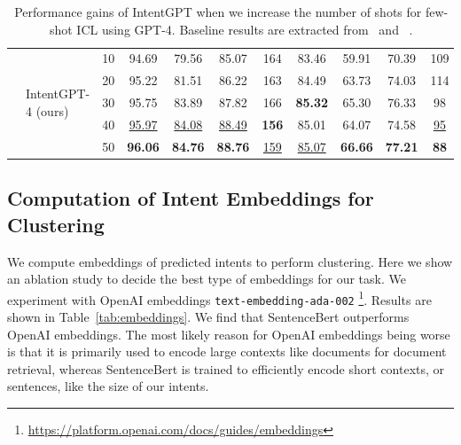 \documentclass[11pt]{article}
\begin{document}
\begin{table}[ht]
{\begin{tabular}{@{}llccccccccc@{}}
                                        & \multirow{5}{*}{IntentGPT-4 (ours)}
                                        & 10 & 94.69 & 79.56 & 85.07 & 164 & 83.46 & 59.91 & 70.39 & 109\\
                                        & & 20 & 95.22 & 81.51 & 86.22 & 163 & 84.49 & 63.73 & 74.03 & 114\\
                                        & & 30 & 95.75 & 83.89 & 87.82 & 166 & \textbf{85.32} & 65.30 & 76.33 & 98\\
                                        & & 40 & \underline{95.97} & \underline{84.08} & \underline{88.49} & \textbf{156} & 85.01 & 64.07 & 74.58 & \underline{95}\\
                                        & & 50 & \textbf{96.06} & \textbf{84.76} & \textbf{88.76} & \underline{159} & \underline{85.07} & \textbf{66.66} & \textbf{77.21} & \textbf{88}\\
        \bottomrule
    \end{tabular}
    
    }
\caption{Performance gains of IntentGPT when we increase the number of shots for few-shot ICL using GPT-4. Baseline results are extracted from~\citet{kumar2022intent} and ~\citet{zhang2021discovering}.}
\vspace{-2mm}
\label{tab:increase-shots}
\end{table}

\subsection{Computation of Intent Embeddings for Clustering}
We compute embeddings of predicted intents to perform clustering. Here we show an ablation study to decide the best type of embeddings for our task. We experiment with OpenAI embeddings \texttt{text-embedding-ada-002} \footnote{\url{https://platform.openai.com/docs/guides/embeddings}}. Results are shown in Table~\ref{tab:embeddings}. We find that SentenceBert outperforms OpenAI embeddings. The most likely reason for OpenAI embeddings being worse is that it is primarily used to encode large contexts like documents for document retrieval, whereas SentenceBert is trained to efficiently encode short contexts, or sentences, like the size of our intents.
\end{document}
